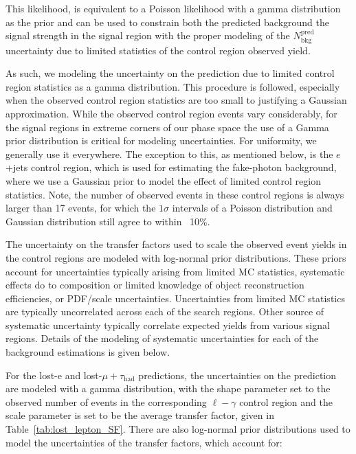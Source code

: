 This likelihood, is equivalent to a Poisson likelihood with a gamma distribution
as the prior and can be used to constrain both the predicted background the 
signal strength in the signal region with the proper modeling of the $N^{\mathrm{pred}}_{\mathrm{bkg}}$ 
uncertainty due to limited statistics of the control region observed yield.

As such, we modeling the uncertainty on the prediction due to limited 
control region statistics as a gamma distribution.  This procedure is followed, especially when the 
observed control region statistics are too small to justifying a Gaussian 
approximation.  While the observed control region events vary considerably, 
for the signal regions in extreme corners of our phase space the use of a 
Gamma prior distribution is critical for modeling uncertainties.  For uniformity, 
we generally use it everywhere.  The exception to this, as mentioned below, is 
the $e$+jets control region, 
which is used for estimating the fake-photon background, where we use a Gaussian prior 
to model the effect of limited control region statistics.  Note, the number of 
observed events in these control regions is always larger than 17 events, for 
which the $1\sigma$ intervals of a Poisson distribution and Gaussian distribution
still agree to within ~10\%.  

The uncertainty on the transfer factors used to scale the observed event yields 
in the control regions are modeled with log-normal prior
distributions.  These priors account for uncertainties typically arising 
from limited MC statistics, systematic effects do to composition or limited knowledge 
of object reconstruction efficiencies, or PDF/scale uncertainties.  Uncertainties 
from limited MC statistics are typically uncorrelated across each of the 
search regions.  Other source of systematic uncertainty typically correlate 
expected yields from various signal regions.  Details of the modeling of 
systematic uncertainties for each of the background estimations is given below. 

For the lost-e and lost-$\mu+\tau_{\mathrm{had}}$ predictions, the uncertainties
on the prediction are modeled with a gamma distribution, with the 
shape parameter set to the observed number of events in the corresponding
$\ell-\gamma$ control region and the scale parameter is set to be the
average transfer factor, given in Table~\ref{tab:lost_lepton_SF}.  There 
are also log-normal prior distributions used to model the uncertainties
of the transfer factors, which account for:

